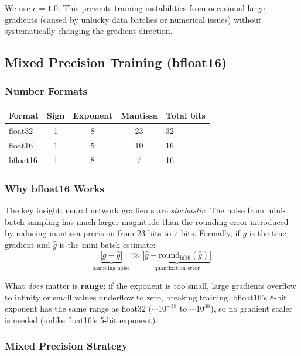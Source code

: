 \documentclass[11pt, a4paper]{article}
\theoremstyle{definition}
\begin{document}
We use $c = 1.0$. This prevents training instabilities from occasional large gradients (caused by unlucky data batches or numerical issues) without systematically changing the gradient direction.

\subsection{Mixed Precision Training (bfloat16)}

\subsubsection{Number Formats}

\begin{center}
\begin{tabular}{lccc}
\toprule
Format & Sign & Exponent & Mantissa & Total bits \\
\midrule
float32 & 1 & 8 & 23 & 32 \\
float16 & 1 & 5 & 10 & 16 \\
bfloat16 & 1 & 8 & 7 & 16 \\
\bottomrule
\end{tabular}
\end{center}

\subsubsection{Why bfloat16 Works}

The key insight: neural network gradients are \emph{stochastic}. The noise from mini-batch sampling has much larger magnitude than the rounding error introduced by reducing mantissa precision from 23 bits to 7 bits. Formally, if $g$ is the true gradient and $\hat{g}$ is the mini-batch estimate:
\begin{equation}
    \underbrace{|g - \hat{g}|}_{\text{sampling noise}} \gg \underbrace{|\hat{g} - \text{round}_{\text{bf16}}(\hat{g})|}_{\text{quantization error}}
\end{equation}

What \emph{does} matter is \textbf{range}: if the exponent is too small, large gradients overflow to infinity or small values underflow to zero, breaking training. bfloat16's 8-bit exponent has the same range as float32 ($\sim 10^{-38}$ to $\sim 10^{38}$), so no gradient scaler is needed (unlike float16's 5-bit exponent).

\subsubsection{Mixed Precision Strategy}
\end{document}
